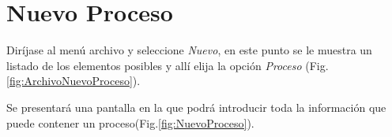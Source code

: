 \section{Nuevo Proceso}
\label{sec:nuevoProceso}
Dir\'ijase al men\'u archivo y seleccione \emph{Nuevo}, en este punto se le muestra un listado de los elementos posibles y
all\'i elija la opci\'on \emph{Proceso} (Fig.\ref{fig:ArchivoNuevoProceso}). 
  

Se presentar\'a una pantalla en la que podr\'a introducir toda la informaci\'on
que puede contener un proceso(Fig.\ref{fig:NuevoProceso}). 
  

